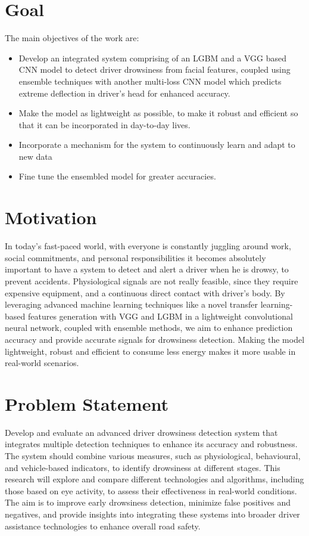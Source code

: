 \vspace{10in}
\section{Goal}
The main objectives of the work are:
\begin{itemize}

    \item Develop an integrated system comprising of an LGBM and a VGG based CNN model to detect driver drowsiness from facial features, coupled using ensemble techniques with another multi-loss CNN model which predicts extreme deflection in driver's head for enhanced accuracy.

    \item Make the model as lightweight as possible, to make it robust and efficient so that it can be incorporated in day-to-day lives.

    \item Incorporate a mechanism for the system to continuously learn and adapt to new data

    \item Fine tune the ensembled model for greater accuracies.

\end{itemize}

\section{Motivation}
In today's fast-paced world, with everyone is constantly juggling  around work, social commitments, and personal responsibilities it becomes absolutely important to have a system to detect and alert a driver when he is drowsy, to prevent accidents. Physiological signals are not really feasible, since they require expensive equipment, and a continuous direct contact with driver's body. By leveraging advanced machine learning techniques like a novel transfer
learning-based features generation with VGG and LGBM in a lightweight convolutional neural network, coupled with ensemble methods, we aim to enhance prediction accuracy and provide accurate signals for drowsiness detection. Making the model lightweight, robust and efficient to consume less energy makes it more usable in real-world scenarios.

\section{Problem Statement}

Develop and evaluate an advanced driver drowsiness detection system that integrates multiple detection techniques to enhance its accuracy and robustness. The system should combine various measures, such as physiological, behavioural, and vehicle-based indicators, to identify drowsiness at different stages. This research will explore and compare different technologies and algorithms, including those based on eye activity, to assess their effectiveness in real-world conditions. The aim is to improve early drowsiness detection, minimize false positives and negatives, and provide insights into integrating these systems into broader driver assistance technologies to enhance overall road safety.


